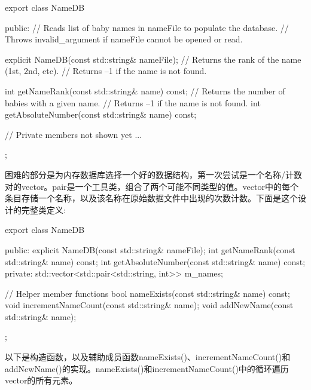 \begin{cpp}
export class NameDB
{
    public:
        // Reads list of baby names in nameFile to populate the database.
        // Throws invalid_argument if nameFile cannot be opened or read.

        explicit NameDB(const std::string& nameFile);
        // Returns the rank of the name (1st, 2nd, etc).
        // Returns –1 if the name is not found.

        int getNameRank(const std::string& name) const;
        // Returns the number of babies with a given name.
        // Returns –1 if the name is not found.
        int getAbsoluteNumber(const std::string& name) const;

        // Private members not shown yet ...
};
\end{cpp}

困难的部分是为内存数据库选择一个好的数据结构，第一次尝试是一个名称/计数对的vector。pair是一个工具类，组合了两个可能不同类型的值。vector中的每个条目存储一个名称，以及该名称在原始数据文件中出现的次数计数。下面是这个设计的完整类定义:

\begin{cpp}
export class NameDB
{
    public:
        explicit NameDB(const std::string& nameFile);
        int getNameRank(const std::string& name) const;
        int getAbsoluteNumber(const std::string& name) const;
    private:
        std::vector<std::pair<std::string, int>> m_names;

        // Helper member functions
        bool nameExists(const std::string& name) const;
        void incrementNameCount(const std::string& name);
        void addNewName(const std::string& name);
};
\end{cpp}

以下是构造函数，以及辅助成员函数nameExists()、incrementNameCount()和addNewName()的实现。nameExists()和incrementNameCount()中的循环遍历vector的所有元素。

